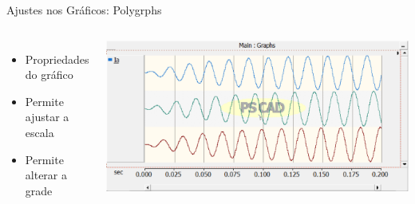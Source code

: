 \begin{frame}{Ajustes nos Gráficos: Polygrphs}
\centering

\begin{columns}

\begin{itemize}
\item Propriedades do gráfico
\vspace*{1cm}
\item Permite ajustar a escala
\vspace*{1cm}
\item Permite alterar a grade
\end{itemize}


\centering
\includegraphics[width=0.9\linewidth]{./figuras/Visualizacao-resultados/graficos-polygraph}

\end{columns}

\end{frame}





